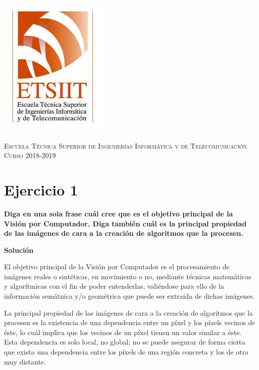\documentclass[11pt,a4paper]{article}
\newcommand{\answer}{\noindent\textbf{Solución}}
\newcommand{\question}[1]{\noindent\textbf{#1}}
\newcommand{\nonumbersection}[1]{\section*{#1}\addcontentsline{toc}{section}{#1}}
\begin{document}
\begin{titlepage}
\begin{minipage}{\textwidth}
\includegraphics[scale=0.3]{img/etsiit.jpeg}

\vspace{0.7cm}
\textsc{Escuela Técnica Superior de Ingenierías Informática y de Telecomunicación}\\
\vspace{1cm}
\textsc{Curso 2018-2019}
\end{minipage}
\end{titlepage}

\tableofcontents
\thispagestyle{empty}				%

\newpage

\setlength{\parskip}{1em}

\nonumbersection{Ejercicio 1}

\question{Diga en una sola frase cuál cree que es el objetivo principal de la Visión por Computador. Diga también cuál es la
principal propiedad de las imágenes de cara a la creación de algoritmos que la procesen.}

\answer

El objetivo principal de la Visión por Computador es el procesamiento de imágenes reales o sintéticas, en movimiento
o no, mediante técnicas matemáticas y algorítmicas con el fin de poder entenderlas, valiéndose para ello de la información
semátnica y/o geométrica que puede ser extraída de dichas imágenes.

La principal propiedad de las imágenes de cara a la creación de algoritmos que la procesen es la existencia de una dependencia
entre un píxel y los píxels vecinos de éste, lo cuál implica que los vecinos de un píxel tienen un valor similar a éste. Esta
dependencia es solo local, no global; no se puede asegurar de forma cierta que exista una dependencia entre los píxels de una
región concreta y los de otra muy distante.
\end{document}
